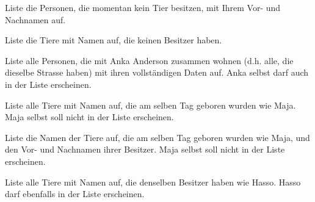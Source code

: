 \begin{compactenum}[a)]
\item Liste die Personen, die momentan kein Tier besitzen, mit Ihrem Vor- und
 Nachnamen auf.
\item Liste die Tiere mit Namen auf, die keinen Besitzer haben.
\item Liste alle Personen, die mit Anka Anderson zusammen wohnen (d.h. alle, die
 dieselbe Strasse haben) mit ihren vollständigen Daten auf. Anka selbst darf
 auch in der Liste erscheinen.
\item Liste alle Tiere mit Namen auf, die am selben Tag geboren wurden wie Maja.
 Maja selbst soll nicht in der Liste erscheinen.
\item Liste die Namen der Tiere auf, die am selben Tag geboren wurden wie Maja,
und den Vor- und Nachnamen ihrer Besitzer. Maja selbst soll nicht in der Liste
erscheinen.
\item Liste alle Tiere mit Namen auf, die denselben Besitzer haben wie Hasso.
Hasso darf ebenfalls in der Liste erscheinen.
\end{compactenum}